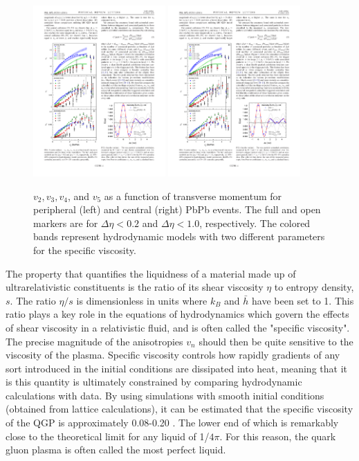   \begin{figure}[htpb]
    \centering
    \includegraphics[width=0.45\textwidth]{Introduction/flow_measurements_peripheral.pdf}
    \includegraphics[width=0.45\textwidth]{Introduction/flow_measurements_central.pdf}
    \caption{$v_2, v_3, v_4$, and  $v_5$ as a function of transverse momentum for peripheral (left) and central (right) PbPb events. The full and open markers are for  $\Delta\eta < 0.2$ and  $\Delta\eta < 1.0$, respectively. The colored bands represent hydrodynamic models with two different parameters for the specific viscosity.}
    \label{fig:flow_measurements}
  \end{figure}


The property that quantifies the liquidness of a material made up of ultrarelativistic constituents is the ratio of its shear viscosity $\eta$ to entropy density, $s$. The ratio $\eta/s$ is dimensionless in units where $k_B$ and $\bar{h}$ have been set to 1. This ratio plays a key role in the equations of hydrodynamics which govern the effects of shear viscosity in a relativistic fluid, and is often called the "specific viscosity". The precise magnitude of the anisotropies $v_n$ should then be quite sensitive to the viscosity of the plasma. Specific viscosity controls how rapidly gradients of any sort introduced in the initial conditions are dissipated into heat, meaning that it is this quantity is ultimately constrained by comparing hydrodynamic calculations with data. By using simulations with smooth initial conditions (obtained from lattice calculations),  it can be estimated that the specific viscosity of the QGP is approximately 0.08-0.20 \cite{Romatschke2007}. The lower end of which is remarkably close to the theoretical limit for any liquid of 1/$4\pi$. For this reason, the quark gluon plasma is often called the most perfect liquid.

